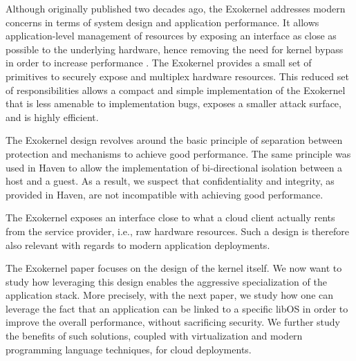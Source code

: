 Although originally published two decades ago, the Exokernel addresses modern concerns in terms of system design and application performance.
It allows application-level management of resources by exposing an interface as close as possible to the underlying hardware, hence removing the need for kernel bypass in order to increase performance \cite{BelayPKGKB14,DBLP:journals/tocs/CaoFKL96}.
The Exokernel provides a small set of primitives to securely expose and multiplex hardware resources.
This reduced set of responsibilities allows a compact and simple implementation of the Exokernel that is less amenable to implementation bugs, exposes a smaller attack surface, and is highly efficient.

The Exokernel design revolves around the basic principle of separation between protection and mechanisms to achieve good performance.
The same principle was used in Haven to allow the implementation of bi-directional isolation between a host and a guest.
As a result, we suspect that confidentiality and integrity, as provided in Haven, are not incompatible with achieving good performance.

The Exokernel exposes an interface close to what a cloud client actually rents from the service provider, i.e., raw hardware resources.
Such a design is therefore also relevant with regards to modern application deployments. 

The Exokernel paper focuses on the design of the kernel itself.
We now want to study how leveraging this design enables the aggressive specialization of the application stack.
More precisely, with the next paper, we study how one can leverage the fact that an application can be linked to a specific libOS in order to improve the overall performance, without sacrificing security.
We further study the benefits of such solutions, coupled with virtualization and modern programming language techniques, for cloud deployments.